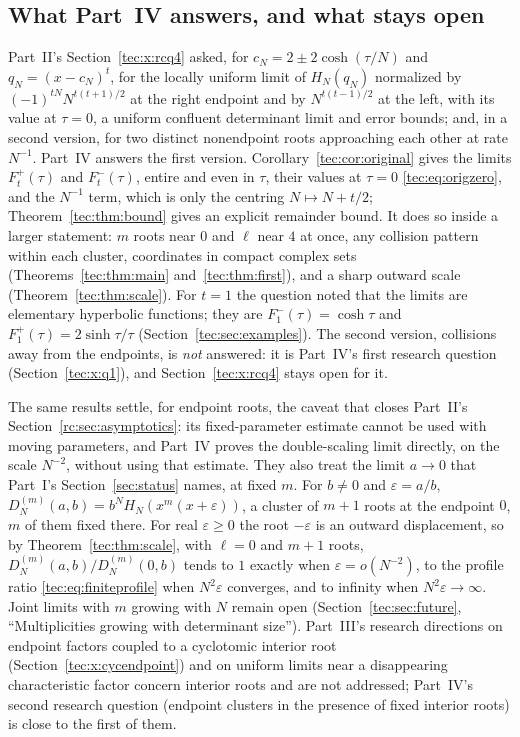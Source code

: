 \documentclass[11pt,a4paper]{article}
\numberwithin{equation}{section}
\theoremstyle{definition}
\theoremstyle{remark}
\begin{document}
\subsection{What Part~IV answers, and what stays open}\label{tec:sec:answers}
Part~II's Section~\ref{tec:x:rcq4} asked, for $c_N=2\pm2\cosh(\tau/N)$ and
$q_N=(x-c_N)^t$, for the locally uniform limit of $H_N(q_N)$ normalized by
$(-1)^{tN}N^{t(t+1)/2}$ at the right endpoint and by $N^{t(t-1)/2}$ at the
left, with its value at $\tau=0$, a uniform confluent determinant limit and
error bounds; and, in a second version, for two distinct nonendpoint roots
approaching each other at rate $N^{-1}$.  Part~IV answers the first version.
Corollary~\ref{tec:cor:original} gives the limits $F_t^+(\tau)$ and
$F_t^-(\tau)$, entire and even in $\tau$, their values at $\tau=0$
\eqref{tec:eq:origzero}, and the $N^{-1}$ term, which is only the centring
$N\mapsto N+t/2$; Theorem~\ref{tec:thm:bound} gives an explicit remainder
bound.  It does so inside a larger statement: $m$ roots near $0$ and $\ell$
near $4$ at once, any collision pattern within each cluster, coordinates in
compact complex sets (Theorems~\ref{tec:thm:main} and~\ref{tec:thm:first}),
and a sharp outward scale (Theorem~\ref{tec:thm:scale}).  For $t=1$ the
question noted that the limits are elementary hyperbolic functions; they are
$F_1^-(\tau)=\cosh\tau$ and $F_1^+(\tau)=2\sinh\tau/\tau$
(Section~\ref{tec:sec:examples}).  The second version, collisions away from
the endpoints, is \emph{not} answered: it is Part~IV's first research
question (Section~\ref{tec:x:q1}), and Section~\ref{tec:x:rcq4} stays open
for it.


The same results settle, for endpoint roots, the caveat that closes Part~II's
Section~\ref{rc:sec:asymptotics}: its fixed-parameter estimate cannot be
used with moving parameters, and Part~IV proves the double-scaling limit
directly, on the scale $N^{-2}$, without using that estimate.  They also
treat the limit $a\to0$ that Part~I's Section~\ref{sec:status} names, at
fixed $m$.  For $b\ne0$ and $\varepsilon=a/b$,
$D_N^{(m)}(a,b)=b^NH_N(x^m(x+\varepsilon))$, a cluster of $m+1$ roots at
the endpoint $0$, $m$ of them fixed there.  For real $\varepsilon\ge0$ the
root $-\varepsilon$ is an outward displacement, so by
Theorem~\ref{tec:thm:scale}, with $\ell=0$ and $m+1$ roots,
$D_N^{(m)}(a,b)/D_N^{(m)}(0,b)$ tends to $1$ exactly when
$\varepsilon=o(N^{-2})$, to the profile ratio \eqref{tec:eq:finiteprofile}
when $N^2\varepsilon$ converges, and to infinity when
$N^2\varepsilon\to\infty$.  Joint limits with $m$ growing with $N$ remain
open (Section~\ref{tec:sec:future}, ``Multiplicities growing with
determinant size'').  Part~III's research directions on endpoint factors
coupled to a cyclotomic interior root (Section~\ref{tec:x:cycendpoint}) and
on uniform limits near a disappearing characteristic factor concern
interior roots and are not addressed; Part~IV's second research question
(endpoint clusters in the presence of fixed interior roots) is close to
the first of them.
\end{document}
